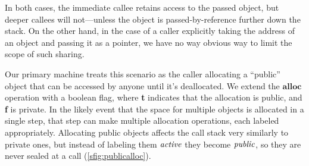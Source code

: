 \documentclass[10pt,conference]{ieeetran}%
\theoremstyle{definition}
\begin{document}
In both cases, the immediate callee retains access to the passed object, but deeper
callees will not---unless the object is passed-by-reference further down the stack.
On the other hand, in the case of a caller explicitly taking the address of an
object and passing it as a pointer, we have no way obvious way to limit the scope
of such sharing.

Our primary  machine treats this scenario as the caller allocating a ``public''
object that can be accessed by anyone until it's deallocated. We extend the
\(\mathbf{alloc}\) operation with a boolean flag, where {\bf t} indicates
that the allocation is public, and {\bf f} is private.
In the likely event that the space for multiple objects is allocated in a single step,
that step can make multiple allocation operations, each labeled appropriately.
Allocating public objects affects the call stack very similarly to private ones,
but instead of labeling them \(\mathit{active}\) they become \(\mathit{public}\), so they are
never sealed at a call (\cref{sfig:publicalloc}).
\end{document}
